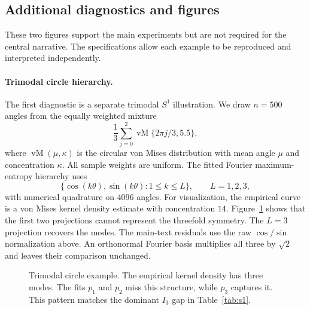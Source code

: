 \documentclass[twoside]{article}
\theoremstyle{definition}
\theoremstyle{remark}
\begin{document}
\subsection{Additional diagnostics and figures}
\label{app:additional_figures}

These two figures support the main experiments but are not required for the central narrative. The specifications allow each example to be reproduced and interpreted independently.

\paragraph{Trimodal circle hierarchy.}
The first diagnostic is a separate trimodal $S^1$ illustration. We draw $n=500$ angles from the equally weighted mixture
\[
  \frac{1}{3}\sum_{j=0}^{2} \operatorname{vM}\{2\pi j/3,5.5\},
\]
where $\operatorname{vM}(\mu,\kappa)$ is the circular von Mises distribution with mean angle $\mu$ and concentration $\kappa$. All sample weights are uniform. The fitted Fourier maximum-entropy hierarchy uses
\[
  \{\cos(k\theta),\sin(k\theta):1\le k\le L\},
  \qquad L=1,2,3,
\]
with numerical quadrature on 4096 angles. For visualization, the empirical curve is a von Mises kernel density estimate with concentration $14$. Figure~\ref{fig:s1_hierarchy} shows that the first two projections cannot represent the threefold symmetry. The $L=3$ projection recovers the modes. The main-text residuals use the raw $\cos/\sin$ normalization above. An orthonormal Fourier basis multiplies all three by $\sqrt2$ and leaves their comparison unchanged.

\begin{figure}[ht]
\centering

\caption{Trimodal circle example. The empirical kernel density has three modes. The fits $p_1$ and $p_2$ miss this structure, while $p_3$ captures it. This pattern matches the dominant $I_3$ gap in Table~\ref{tab:s1}.}
\label{fig:s1_hierarchy}
\end{figure}
\end{document}
